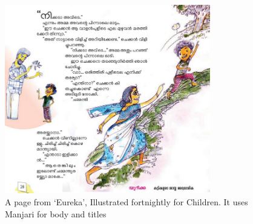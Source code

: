 \documentclass[11pt,twoside,a4paper,parskip=full]{scrartcl}
\begin{document}
\begin{figure}[h!]
	\includegraphics[width=0.8\textwidth]{images/manjari-sample-1.png}
	\caption{A page from `Eureka', Illustrated fortnightly for Children. It uses Manjari for body and titles}
	\label{manjari-sample-1}
\end{figure}
\end{document}
